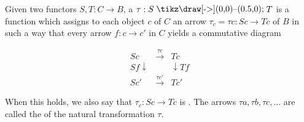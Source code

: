 Given two functors $S, T: C \rightarrow B$, a  $\tau: S \mathbin{\raisebox{0.5pt}{\hspace{0.5pt}\tikz\draw[->](0,0)--(0.5,0);\hspace{0.5pt}}} T$ is a function which assigns to each object $c$ of $C$ an arrow $\tau_c = \tau c: Sc \rightarrow Tc$ of $B$ in such a way that every arrow $f: c \rightarrow c'$ in $C$ yields a commutative diagram

$$
\begin{array}{ccc}
Sc & \xrightarrow{\tau c} & Tc \\
{\scriptstyle Sf}\downarrow & & \downarrow {\scriptstyle Tf} \\
Sc' & \xrightarrow{\tau c'} & Tc'
\end{array}
$$

When this holds, we also say that $\tau_c: Sc \rightarrow Tc$ is . The arrows $\tau a, \tau b, \tau c, \ldots$ are called the  of the natural transformation $\tau$.
